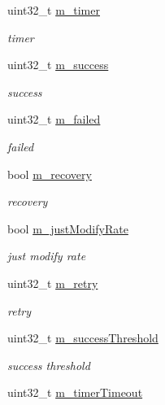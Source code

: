 \begin{DoxyCompactItemize}
\item 
uint32\+\_\+t \hyperlink{structns3_1_1AarfcdWifiRemoteStation_a4e877457449bf8ecfd1aa59fda87256d}{m\+\_\+timer}
\begin{DoxyCompactList}\small\item\em timer \end{DoxyCompactList}\item 
uint32\+\_\+t \hyperlink{structns3_1_1AarfcdWifiRemoteStation_a87a9f7bd4782c9189bd31c3faf356905}{m\+\_\+success}
\begin{DoxyCompactList}\small\item\em success \end{DoxyCompactList}\item 
uint32\+\_\+t \hyperlink{structns3_1_1AarfcdWifiRemoteStation_afbf9dcfa26e918d356b28634c9cb7f19}{m\+\_\+failed}
\begin{DoxyCompactList}\small\item\em failed \end{DoxyCompactList}\item 
bool \hyperlink{structns3_1_1AarfcdWifiRemoteStation_ae4a988ac753131e795155a7f842fd69a}{m\+\_\+recovery}
\begin{DoxyCompactList}\small\item\em recovery \end{DoxyCompactList}\item 
bool \hyperlink{structns3_1_1AarfcdWifiRemoteStation_ad36cfb187025b2d545c01b5da781e566}{m\+\_\+just\+Modify\+Rate}
\begin{DoxyCompactList}\small\item\em just modify rate \end{DoxyCompactList}\item 
uint32\+\_\+t \hyperlink{structns3_1_1AarfcdWifiRemoteStation_a63ee7365572f86d4527560433d7dc353}{m\+\_\+retry}
\begin{DoxyCompactList}\small\item\em retry \end{DoxyCompactList}\item 
uint32\+\_\+t \hyperlink{structns3_1_1AarfcdWifiRemoteStation_a4e438396260a93d5457dd61f6af2ab7b}{m\+\_\+success\+Threshold}
\begin{DoxyCompactList}\small\item\em success threshold \end{DoxyCompactList}\item 
uint32\+\_\+t \hyperlink{structns3_1_1AarfcdWifiRemoteStation_ad908ee9e8c0eeb03f699e699d52b2d3a}{m\+\_\+timer\+Timeout}

\end{DoxyCompactItemize}
